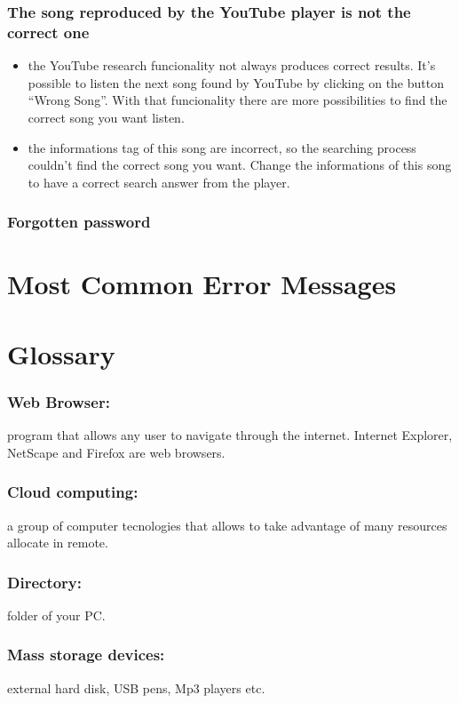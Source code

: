 \subsection*{The song reproduced by the YouTube player is not the correct one}
\begin{itemize}
  \item the YouTube research funcionality not always produces correct results.
  It's possible to listen the next song found by YouTube by clicking on the button
  ``Wrong Song''. With that funcionality there are more possibilities to find
  the correct song you want listen.
  \item the informations tag of this song are incorrect, so the searching
  process couldn't find the correct song you want. Change the informations of
  this song to have a correct search answer from the player.
\end{itemize}

\subsection*{Forgotten password}

\appendix %
\chapter{Most Common Error Messages}
\thispagestyle{fancy}

\chapter{Glossary}
\thispagestyle{fancy}

\subsection*{Web Browser:} program that allows any user to navigate through the
internet. Internet Explorer, NetScape and Firefox are web browsers. 
\subsection*{Cloud computing:} a group of computer tecnologies that allows to
take advantage of many resources allocate in remote. 
\subsection*{Directory:}
folder of your PC. 
\subsection*{Mass storage devices:} external hard disk, USB pens, Mp3 players
etc. 
